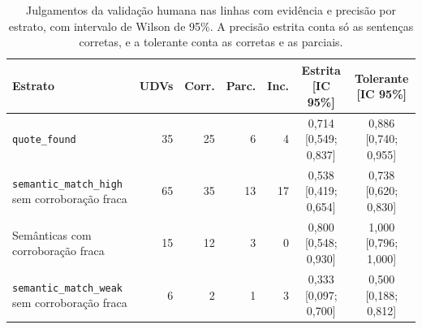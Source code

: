\begin{table}[!htb]
  \centering
  \caption{Julgamentos da validação humana nas linhas com evidência e precisão por estrato, com
  intervalo de Wilson de 95\%. A precisão estrita conta só as sentenças corretas, e a tolerante
  conta as corretas e as parciais.}
  \label{tab:validacao}
  \small
  \begin{tabularx}{\textwidth}{@{}>{\raggedright\arraybackslash}Xrrrrcc@{}}
    \toprule
    \textbf{Estrato} & \textbf{UDVs} & \textbf{Corr.} & \textbf{Parc.} & \textbf{Inc.} & \textbf{Estrita [IC 95\%]} & \textbf{Tolerante [IC 95\%]} \\
    \midrule
    \texttt{quote\_found}                                 & 35 & 25 &  6 &  4 & 0,714 [0,549; 0,837] & 0,886 [0,740; 0,955] \\
    \texttt{semantic\_match\_high} sem corroboração fraca & 65 & 35 & 13 & 17 & 0,538 [0,419; 0,654] & 0,738 [0,620; 0,830] \\
    Semânticas com corroboração fraca                     & 15 & 12 &  3 &  0 & 0,800 [0,548; 0,930] & 1,000 [0,796; 1,000] \\
    \texttt{semantic\_match\_weak} sem corroboração fraca &  6 &  2 &  1 &  3 & 0,333 [0,097; 0,700] & 0,500 [0,188; 0,812] \\
    \bottomrule
  \end{tabularx}
\end{table}
